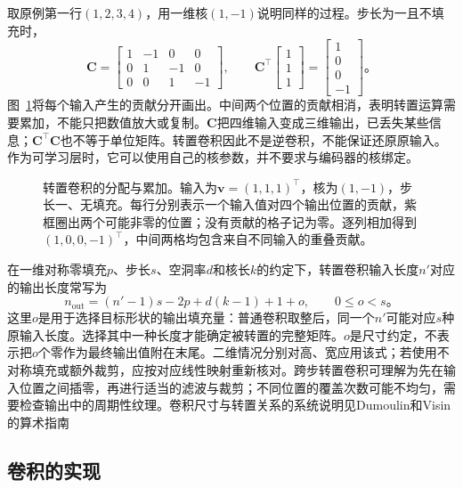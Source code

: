 取原例第一行$(1,2,3,4)$，用一维核$(1,-1)$说明同样的过程。步长为一且不填充时，
\begin{equation}
  \bm C=\begin{bmatrix}
    1&-1&0&0\\0&1&-1&0\\0&0&1&-1
  \end{bmatrix},\qquad
  \bm C^\top\begin{bmatrix}1\\1\\1\end{bmatrix}
    =\begin{bmatrix}1\\0\\0\\-1\end{bmatrix}\text{。}
  \label{eq:cnn-transpose-example}
\end{equation}
图~\ref{fig:cnn-transpose-scatter}将每个输入产生的贡献分开画出。中间两个位置的贡献相消，表明转置运算需要累加，不能只把数值放大或复制。$\bm C$把四维输入变成三维输出，已丢失某些信息；$\bm C^\top\bm C$也不等于单位矩阵。转置卷积因此不是逆卷积，不能保证还原原输入。作为可学习层时，它可以使用自己的核参数，并不要求与编码器的核绑定。


\begin{figure}[htb]
  \centering
  
  \caption{转置卷积的分配与累加。输入为$\bm v=(1,1,1)^\top$，核为$(1,-1)$，步长一、无填充。每行分别表示一个输入值对四个输出位置的贡献，紫框圈出两个可能非零的位置；没有贡献的格子记为零。逐列相加得到$(1,0,0,-1)^\top$，中间两格均包含来自不同输入的重叠贡献。}
  \label{fig:cnn-transpose-scatter}
\end{figure}
在一维对称零填充$p$、步长$s$、空洞率$d$和核长$k$的约定下，转置卷积输入长度$n'$对应的输出长度常写为
\begin{equation}
  n_{\mathrm{out}}=(n'-1)s-2p+d(k-1)+1+o,
  \qquad 0\leq o<s\text{。}
  \label{eq:cnn-transposed-size}
\end{equation}
这里$o$是用于选择目标形状的输出填充量：普通卷积取整后，同一个$n'$可能对应$s$种原输入长度。选择其中一种长度才能确定被转置的完整矩阵。$o$是尺寸约定，不表示把$o$个零作为最终输出值附在末尾。二维情况分别对高、宽应用该式；若使用不对称填充或额外裁剪，应按对应线性映射重新核对。跨步转置卷积可理解为先在输入位置之间插零，再进行适当的滤波与裁剪；不同位置的覆盖次数可能不均匀，需要检查输出中的周期性纹理。卷积尺寸与转置关系的系统说明见Dumoulin和Visin的算术指南

\subsection{卷积的实现}
\label{sec:cnn-implementation}


